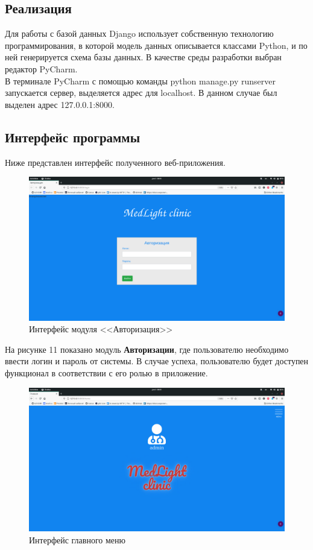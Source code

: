 \documentclass[a4paper, 10pt]{article}
\begin{document}
	\subsection{Реализация}
	\hspace*{5mm} Для работы с базой данных Django\cite{djangoproject} использует собственную технологию программирования, в которой модель данных описывается классами Python, и по ней генерируется схема базы данных. В качестве среды разработки выбран редактор PyCharm. 
	\\ \hspace*{5mm} В терминале PyCharm с помощью команды python manage.py runserver запускается сервер, выделяется адрес для localhost. В данном случае был выделен адрес 127.0.0.1:8000. 
	
	\subsection{Интерфейс программы}
	\hspace*{5mm} Ниже представлен интерфейс полученного веб-приложения. 
	\clearpage
	\newpage
	\begin{figure}[t!]
		\centering
		\includegraphics[scale=0.12]{auth}
		\centering\caption{Интерфейс модуля <<Авторизация>>}
	\end{figure}
	\hspace*{5mm} На рисунке 11 показано модуль \textbf{Авторизации}, где пользователю необходимо ввести логин и пароль от системы. В случае успеха, пользователю будет доступен функционал в соответствии с его ролью в приложение.
	 \begin{figure}[h!]
	 	\centering
	 	\includegraphics[scale=0.12]{main}
	 	\centering\caption{Интерфейс главного меню}
	 \end{figure}
\end{document}
